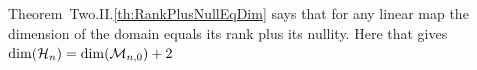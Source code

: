 Theorem~Two.II.\ref{th:RankPlusNullEqDim} says that for any linear map the
dimension of the domain equals its rank plus its nullity.
Here that gives $\dim(\mathcal{H}_n)=\dim(\mathcal{M}_{n,0})+2 $




